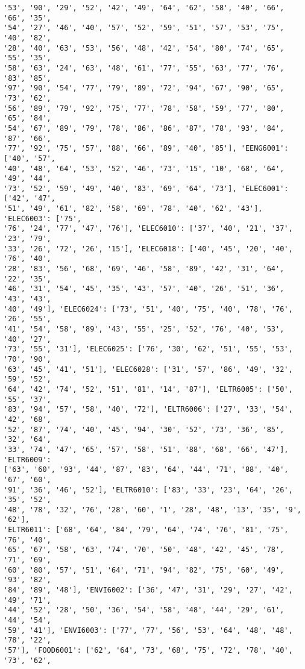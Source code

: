 \documentclass[11pt]{article}
\begin{document}
\begin{Verbatim}[commandchars=\\\{\}]
'53', '90', '29', '52', '42', '49', '64', '62', '58', '40', '66', '66', '35',
'54', '27', '46', '40', '57', '52', '59', '51', '57', '53', '75', '40', '82',
'28', '40', '63', '53', '56', '48', '42', '54', '80', '74', '65', '55', '35',
'58', '63', '24', '63', '48', '61', '77', '55', '63', '77', '76', '83', '85',
'97', '90', '54', '77', '79', '89', '72', '94', '67', '90', '65', '73', '62',
'56', '89', '79', '92', '75', '77', '78', '58', '59', '77', '80', '65', '84',
'54', '67', '89', '79', '78', '86', '86', '87', '78', '93', '84', '87', '66',
'77', '92', '75', '57', '88', '66', '89', '40', '85'], 'EENG6001': ['40', '57',
'40', '48', '64', '53', '52', '46', '73', '15', '10', '68', '64', '49', '44',
'73', '52', '59', '49', '40', '83', '69', '64', '73'], 'ELEC6001': ['42', '47',
'51', '49', '61', '82', '58', '69', '78', '40', '62', '43'], 'ELEC6003': ['75',
'76', '24', '77', '47', '76'], 'ELEC6010': ['37', '40', '21', '37', '23', '79',
'33', '26', '72', '26', '15'], 'ELEC6018': ['40', '45', '20', '40', '76', '40',
'28', '83', '56', '68', '69', '46', '58', '89', '42', '31', '64', '22', '35',
'46', '31', '54', '45', '35', '43', '57', '40', '26', '51', '36', '43', '43',
'40', '49'], 'ELEC6024': ['73', '51', '40', '75', '40', '78', '76', '26', '55',
'41', '54', '58', '89', '43', '55', '25', '52', '76', '40', '53', '40', '27',
'73', '55', '31'], 'ELEC6025': ['76', '30', '62', '51', '55', '53', '70', '90',
'63', '45', '41', '51'], 'ELEC6028': ['31', '57', '86', '49', '32', '59', '52',
'64', '42', '74', '52', '51', '81', '14', '87'], 'ELTR6005': ['50', '55', '37',
'83', '94', '57', '58', '40', '72'], 'ELTR6006': ['27', '33', '54', '42', '68',
'52', '87', '74', '40', '45', '94', '30', '52', '73', '36', '85', '32', '64',
'33', '74', '47', '65', '57', '58', '51', '88', '68', '66', '47'], 'ELTR6009':
['63', '60', '93', '44', '87', '83', '64', '44', '71', '88', '40', '67', '60',
'91', '36', '46', '52'], 'ELTR6010': ['83', '33', '23', '64', '26', '35', '52',
'48', '78', '32', '76', '28', '60', '1', '28', '48', '13', '35', '9', '62'],
'ELTR6011': ['68', '64', '84', '79', '64', '74', '76', '81', '75', '76', '40',
'65', '67', '58', '63', '74', '70', '50', '48', '42', '45', '78', '71', '69',
'60', '80', '57', '51', '64', '71', '94', '82', '75', '60', '49', '93', '82',
'84', '89', '48'], 'ENVI6002': ['36', '47', '31', '29', '27', '42', '49', '71',
'44', '52', '28', '50', '36', '54', '58', '48', '44', '29', '61', '44', '54',
'59', '41'], 'ENVI6003': ['77', '77', '56', '53', '64', '48', '48', '78', '22',
'57'], 'FOOD6001': ['62', '64', '73', '68', '75', '72', '78', '40', '73', '62',

\end{Verbatim}
\end{document}
